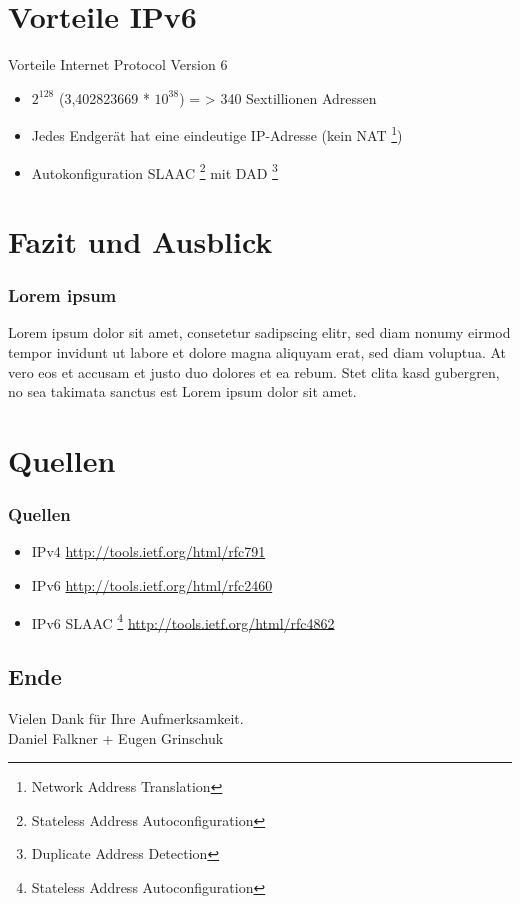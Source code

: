 \documentclass[xcolor=dvipsnames]{beamer}
\newcommand*{\Author}{Daniel Falkner + Eugen Grinschuk} %
\begin{document}
\section{Vorteile IPv6}
\begin{frame}
  \begin{block}{Vorteile Internet Protocol Version 6}
	  \begin{itemize}
  		\item $2^{128}$ (3,402823669 * $10^{38}$) = > 340 Sextillionen Adressen
  		\item Jedes Endgerät hat eine eindeutige IP-Adresse (kein NAT \footnote{Network Address Translation})
  		\item Autokonfiguration SLAAC \footnote{Stateless Address Autoconfiguration} mit DAD \footnote{Duplicate Address Detection}
 
	  \end{itemize}
  \end{block}
\end{frame}



\section{Fazit und Ausblick}
\begin{frame}
 \frametitle{Lorem ipsum}
  Lorem ipsum dolor sit amet, consetetur sadipscing elitr, sed diam nonumy eirmod tempor invidunt ut labore et dolore magna aliquyam erat, sed diam voluptua. At vero eos et accusam et justo duo dolores et ea rebum. Stet clita kasd gubergren, no sea takimata sanctus est Lorem ipsum dolor sit amet.
\end{frame}

\section{Quellen}
\begin{frame}
 \frametitle{Quellen}
  \begin{block}{}
	  \begin{itemize}
  		\item IPv4 \url{http://tools.ietf.org/html/rfc791}
  		\item IPv6 \url{http://tools.ietf.org/html/rfc2460}
  		\item IPv6 SLAAC \footnote{Stateless Address Autoconfiguration} \url{http://tools.ietf.org/html/rfc4862}
	  \end{itemize}
  \end{block}
\end{frame}

\subsection*{Ende}
\begin{frame}
	\begin{block}{}	
		\begin{center}
			Vielen Dank für Ihre Aufmerksamkeit. \\
			\Author{}
		\end{center}	
	\end{block}
\end{frame}
\end{document}
